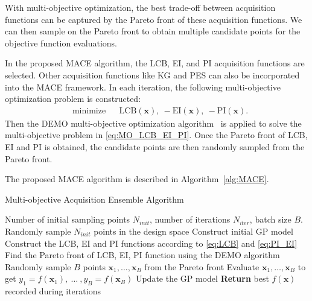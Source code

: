 With multi-objective optimization, the best trade-off between acquisition functions can be captured by the Pareto front of these acquisition functions. We can then sample on the Pareto front to obtain multiple candidate points for the objective function evaluations.

In the proposed MACE algorithm, the LCB, EI, and PI acquisition functions are selected. Other acquisition functions like KG and PES can also be incorporated into the MACE framework. In each iteration, the following multi-objective optimization problem is constructed:
\begin{equation}
    \label{eq:MO_LCB_EI_PI}
    \begin{aligned}
        & \text{minimize} & & \mathrm{LCB}(\bm{x}),~-\mathrm{EI}(\bm{x}),~-\mathrm{PI}(\bm{x}).
    \end{aligned}
\end{equation}
Then the DEMO multi-objective optimization algorithm~\cite{demo} is applied to solve the multi-objective problem in \eqref{eq:MO_LCB_EI_PI}. Once the Pareto front of LCB, EI and PI is obtained, the candidate points are then randomly sampled from the Pareto front.


The proposed MACE algorithm is described in Algorithm~\ref{alg:MACE}.

\begin{algorithm}
    \caption{Multi-objective Acquisition Ensemble Algorithm}
    \label{alg:MACE}
    \begin{algorithmic}[1]
        \REQUIRE Number of initial sampling points $N_{init}$, number of iterations $N_{iter}$, batch size $B$.
        \STATE Randomly sample $N_{init}$ points in the design space
        \STATE Construct initial GP model
        \STATE Construct the LCB, EI and PI functions according to \eqref{eq:LCB} and \eqref{eq:PI_EI}
        \STATE Find the Pareto front of LCB, EI, PI function using the DEMO algorithm
        \STATE Randomly sample $B$ points $\bm{x}_1, \dots, \bm{x}_B$ from the Pareto front
        \STATE Evaluate $\bm{x}_1, \dots, \bm{x}_B$ to get $y_1 = f(\bm{x}_1),~\dots~,y_B = f(\bm{x}_B)$
        \STATE Update the GP model
        \ENDFOR
        \STATE \textbf{Return} best $f(\bm{x})$ recorded during iterations
    \end{algorithmic}
\end{algorithm}

